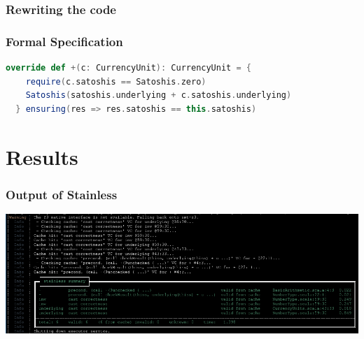 \documentclass{beamer}
\begin{document}
\begin{frame}
\frametitle{Rewriting the code}
\end{frame}


\begin{frame}[fragile]
\frametitle{Formal Specification}
\begin{lstlisting}[language=Scala]
  override def +(c: CurrencyUnit): CurrencyUnit = {
    require(c.satoshis == Satoshis.zero)
    Satoshis(satoshis.underlying + c.satoshis.underlying)
  } ensuring(res => res.satoshis == this.satoshis)
\end{lstlisting}
\end{frame}


\section{Results}

\begin{frame}
\frametitle{Output of Stainless}
\centering
\includegraphics[width=\textwidth,height=0.8\textheight,keepaspectratio]{assets/final_verify_output.png}
\end{frame}
\end{document}
